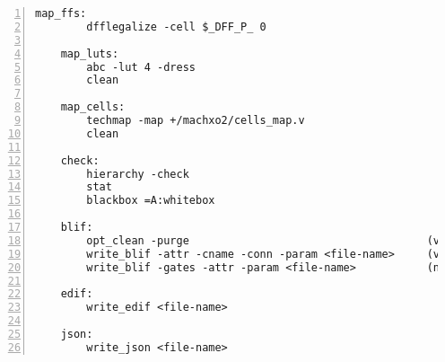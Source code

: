 \begin{lstlisting}[numbers=left,frame=single]
    map_ffs:
        dfflegalize -cell $_DFF_P_ 0

    map_luts:
        abc -lut 4 -dress
        clean

    map_cells:
        techmap -map +/machxo2/cells_map.v
        clean

    check:
        hierarchy -check
        stat
        blackbox =A:whitebox

    blif:
        opt_clean -purge                                     (vpr mode)
        write_blif -attr -cname -conn -param <file-name>     (vpr mode)
        write_blif -gates -attr -param <file-name>           (non-vpr mode)

    edif:
        write_edif <file-name>

    json:
        write_json <file-name>
\end{lstlisting}

